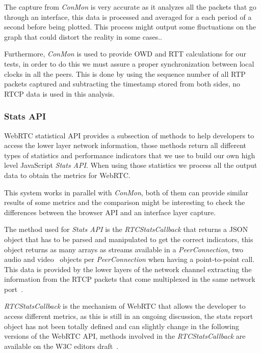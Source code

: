 The capture from {\it ConMon} is very accurate as it analyzes all the packets that go through an interface, this data is processed and averaged for a each period of a second before being plotted. This process might output some fluctuations on the graph that could distort the reality in some cases..

Furthermore, {\it ConMon} is used to provide OWD and RTT calculations for our tests, in order to do this we must assure a proper synchronization between local clocks in all the peers. This is done by using the sequence number of all RTP packets captured and subtracting the timestamp stored from both sides, no RTCP data is used in this analysis.

\subsubsection{Stats API}

WebRTC statistical API provides a subsection of methods to help developers to access the lower layer network information, those methods return all different types of statistics and performance indicators that we use to build our own high level JavaScript {\it Stats API}. When using those statistics we process all the output data to obtain the metrics for WebRTC.

This system works in parallel with {\it ConMon}, both of them can provide similar results of some metrics and the comparison might be interesting to check the differences between the browser API and an interface layer capture. 

The method used for {\it Stats API} is the {\it RTCStatsCallback} that returns a JSON object that has to be parsed and manipulated to get the correct indicators, this object returns as many arrays as streams available in a {\it PeerConnection}, two audio and video~\cite{editorWebRTCdraft} objects per {\it PeerConnection} when having a point-to-point call. This data is provided by the lower layers of the network channel extracting the information from the RTCP packets that come multiplexed in the same network port~\cite{rtpusageIETF}.

{\it RTCStatsCallback} is the mechanism of WebRTC that allows the developer to access different metrics, as this is still in an ongoing discussion, the stats report object has not been totally defined and can slightly change in the following versions of the WebRTC API, methods involved in the {\it RTCStatsCallback} are available on the W3C editors draft~\cite{editorWebRTCdraft}. 

